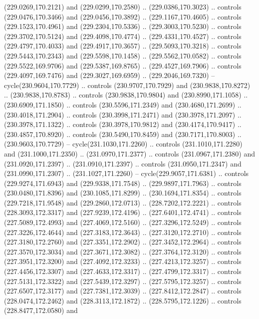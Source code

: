 \begin{scope}[cm={{1.25,0.0,0.0,-1.25,(0.0,442.91375)}}]
    (229.0269,170.2121) and (229.0299,170.2580) .. (229.0386,170.3023) .. controls
    (229.0476,170.3466) and (229.0456,170.3892) .. (229.1167,170.4605) .. controls
    (229.1523,170.4961) and (229.2304,170.5336) .. (229.3003,170.5230) .. controls
    (229.3702,170.5124) and (229.4098,170.4774) .. (229.4331,170.4527) .. controls
    (229.4797,170.4033) and (229.4917,170.3657) .. (229.5093,170.3218) .. controls
    (229.5443,170.2343) and (229.5598,170.1458) .. (229.5562,170.0582) .. controls
    (229.5522,169.9706) and (229.5387,169.8765) .. (229.4527,169.7906) .. controls
    (229.4097,169.7476) and (229.3027,169.6959) .. (229.2046,169.7320) --
    cycle(230.9604,170.7729) .. controls (230.9707,170.7929) and
    (230.9838,170.8272) .. (230.9838,170.8783) .. controls (230.9838,170.9804) and
    (230.8990,171.1058) .. (230.6909,171.1850) .. controls (230.5596,171.2349) and
    (230.4680,171.2699) .. (230.4018,171.2904) .. controls (230.3998,171.2471) and
    (230.3978,171.2097) .. (230.3978,171.1322) .. controls (230.3978,170.9812) and
    (230.4174,170.9417) .. (230.4857,170.8920) .. controls (230.5490,170.8459) and
    (230.7171,170.8003) .. (230.9603,170.7729) -- cycle(231.1030,171.2260) ..
    controls (231.1010,171.2280) and (231.1000,171.2350) .. (231.0970,171.2377) ..
    controls (231.0967,171.2380) and (231.0920,171.2397) .. (231.0910,171.2397) ..
    controls (231.0950,171.2347) and (231.0990,171.2307) .. (231.1027,171.2260) --
    cycle(229.9057,171.6381) .. controls (229.9274,171.6943) and
    (229.9338,171.7548) .. (229.9897,171.7963) .. controls (230.0480,171.8396) and
    (230.1085,171.8299) .. (230.1694,171.8354) .. controls (229.7218,171.9548) and
    (229.2860,172.0713) .. (228.7202,172.2221) .. controls (228.3093,172.3317) and
    (227.9239,172.4196) .. (227.6401,172.4741) .. controls (227.5089,172.4993) and
    (227.4069,172.5160) .. (227.3296,172.5249) .. controls (227.3226,172.4644) and
    (227.3183,172.3643) .. (227.3120,172.2710) .. controls (227.3180,172.2760) and
    (227.3351,172.2902) .. (227.3452,172.2964) .. controls (227.3570,172.3034) and
    (227.3671,172.3082) .. (227.3764,172.3120) .. controls (227.3951,172.3200) and
    (227.4092,172.3233) .. (227.4213,172.3257) .. controls (227.4456,172.3307) and
    (227.4633,172.3317) .. (227.4799,172.3317) .. controls (227.5131,172.3322) and
    (227.5439,172.3297) .. (227.5795,172.3257) .. controls (227.6507,172.3177) and
    (227.7381,172.3039) .. (227.8412,172.2847) .. controls (228.0474,172.2462) and
    (228.3113,172.1872) .. (228.5795,172.1226) .. controls (228.8477,172.0580) and

\end{scope}
